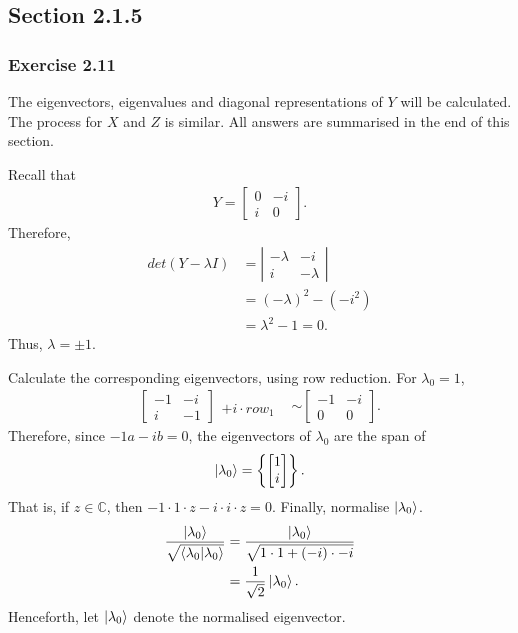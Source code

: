 \subsection{Section 2.1.5}
\subsubsection{Exercise 2.11}
The eigenvectors, eigenvalues and diagonal representations of $Y$ will be calculated.
The process for $X$ and $Z$ is similar.
All answers are summarised in the end of this section.

Recall that
\begin{align}
    Y = \left[ \begin{matrix}
            0 & -i \\
            i & 0
        \end{matrix} \right].
\end{align}
Therefore,
\begin{align}
    det(Y - \lambda I) &= \left| \begin{matrix}
            - \lambda & -i \\
            i & - \lambda
        \end{matrix} \right| \\
    &= (-\lambda)^2 - (- i^2) \\
    &= \lambda^2 -1 = 0 .
\end{align}
Thus, $\lambda = \pm 1$.

Calculate the corresponding eigenvectors, using row reduction.
For $\lambda_0 = 1$,
\begin{align}
    \left[ \begin{matrix}
        -1 & -i \\ i & -1
    \end{matrix} \right]
    \begin{matrix}
        ~ \\
        +i \cdot row_1
    \end{matrix}
    &\sim
    \left[ \begin{matrix}
        -1 & -i \\ 0 & 0
    \end{matrix} \right].
\end{align}
Therefore, since $-1a -ib = 0$,
the eigenvectors of $\lambda_0$ are the span of
\begin{align}
    \ket{\lambda_0} = \left\{ \left[ \begin{matrix} 1 \\ i \end{matrix} \right] \right\}.
\end{align}
That is, if $z \in \mathbb{C}$, then $-1 \cdot 1 \cdot z - i \cdot i \cdot z = 0$.
Finally, normalise $\ket{\lambda_0}$.
\begin{align}
    \frac{\ket{\lambda_0}}{\sqrt{\mathop{\mathinner{ \langle{\lambda_0}|{\lambda_0}\rangle}}}} &=
    \frac{\ket{\lambda_0}}{\sqrt{1\cdot 1 + (-i) \cdot -i}} \\
    &= \frac{1}{\sqrt2} \ket{\lambda_0}.
\end{align}
Henceforth, let $\ket{\lambda_0}$ denote the normalised eigenvector.

